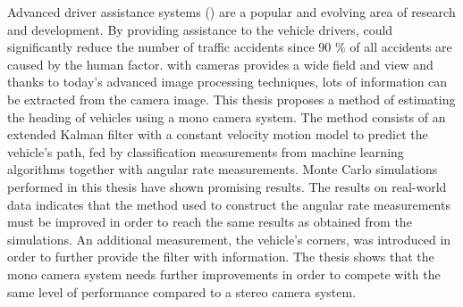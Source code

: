 Advanced driver assistance systems (\abbrADAS) are a popular and evolving area of research and development.
By providing assistance to the vehicle drivers, \abbrADAS could significantly reduce the number of traffic accidents since 90 \% of all accidents are caused by the human factor.
\abbrADAS with cameras provides a wide field and view and thanks to today's advanced image processing techniques, lots of information can be extracted from the camera image.
This thesis proposes a method of estimating the heading of vehicles using a mono camera system.
The method consists of an extended Kalman filter with a constant velocity motion model to predict the vehicle's path, fed by classification measurements from machine learning algorithms together with angular rate measurements.
Monte Carlo simulations performed in this thesis have shown promising results.
The results on real-world data indicates that the method used to construct the angular rate measurements must be improved in order to reach the same results as obtained from the simulations.
An additional measurement, the vehicle's corners, was introduced in order to further provide the filter with information.
The thesis shows that the mono camera system needs further improvements in order to compete with the same level of performance compared to a stereo camera system.
